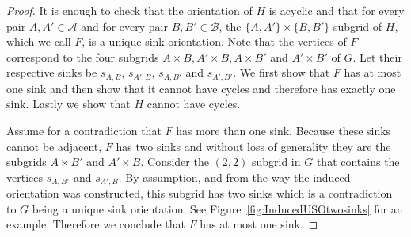 \documentclass[runningheads,a4paper]{llncs}
\newcommand{\A}{\ensuremath{\mathcal A}}
\newcommand{\B}{\ensuremath{\mathcal B}}
\newcommand{\s}[1]{\ensuremath{s_{\scriptscriptstyle#1}}}
\begin{document}
\begin{proof}
It is enough to check that the orientation of $H$ is acyclic and that for every pair $A, A'\in \A$ and for every pair $B,B'\in \B$, the 
$\{A,A'\}\times\{B, B'\}$-subgrid of $H$, which we call $F$, is a unique sink orientation.
Note that the vertices of $F$ correspond to the four subgrids $A\times B, A'\times B, A\times B'$ and $A'\times B'$ of $G$. 
Let their respective sinks be $s_{A,B}$, $s_{A',B}$, $s_{A,B'}$ and $s_{A',B'}$.
We first show that $F$ has at most one sink and then show that it cannot have cycles and therefore has exactly one sink. Lastly we show that $H$ cannot have cycles.

Assume for a contradiction that $F$ has more than one sink.
Because these sinks cannot be adjacent, $F$ has two sinks and without loss of generality they are the subgrids $A\times B'$ and $A'\times B$. Consider the $(2,2)$ subgrid in $G$ that contains the vertices $\s{A,B'}$ and $\s{A',B}$. By assumption, and from the way the induced orientation was constructed, this subgrid has two sinks which is a contradiction to $G$ being a unique sink orientation. See Figure~\ref{fig:InducedUSOtwosinks} for an example. Therefore we conclude that $F$ has at most one sink. 


\end{proof}
\end{document}
